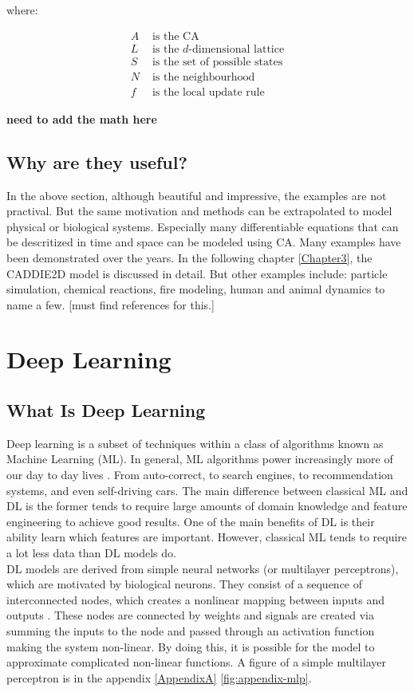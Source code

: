 where:

\begin{align*}
	A 	&  \text{ is the CA} \\
	L 	&  \text{ is the } d \text{-dimensional lattice} \\
	S 	&  \text{ is the set of possible states} \\
	N 	&  \text{ is the neighbourhood} \\
	f 	&  \text{ is the local update rule}
\end{align*}

\textbf{need to add the math here}
\subsection{Why are they useful?}
In the above section, although beautiful and impressive, the examples are not practival. But the same motivation and methods can be extrapolated to model physical or biological systems. Especially many differentiable equations that can be descritized in time and space can be modeled using CA. Many examples have been demonstrated over the years. In the following chapter \ref{Chapter3}, the CADDIE2D model is discussed in detail. But other examples include: particle simulation, chemical reactions, fire modeling, human and animal dynamics to name a few. [must find references for this.]

\section{Deep Learning}
\subsection{What Is Deep Learning}
Deep learning is a subset of techniques within a class of algorithms known as Machine Learning (ML). In general, ML algorithms power increasingly more of our day to day lives \cite{lecun2015deep}. From auto-correct, to search engines, to recommendation systems, and even self-driving cars. The main difference between classical ML and DL is the former tends to require large amounts of domain knowledge and feature engineering to achieve good results. One of the main benefits of DL is their ability learn which features are important. However, classical ML tends to require a lot less data than DL models do. \\

 DL models are derived from simple neural networks (or multilayer perceptrons), which are motivated by biological neurons. They consist of a sequence of interconnected nodes, which creates a nonlinear mapping between inputs and outputs \cite{gardner1998artificial}. These nodes are connected by weights and signals are created via summing the inputs to the node and passed through an activation function making the system non-linear. By doing this, it is possible for the model to approximate complicated non-linear functions. A figure of a simple multilayer perceptron is in the appendix \ref{AppendixA} \ref{fig:appendix-mlp}. \\
 
